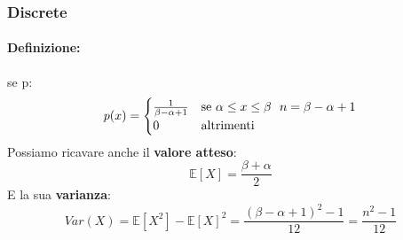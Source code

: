 \documentclass[]{article}
\newcommand{\ev}{\mathbb{E}[X]}
\renewcommand{\ev}[1]{\mathbb{E}[#1]}
\newcommand{\definizione}{\paragraph{Definizione:}}
\begin{document}
    \subsubsection{Discrete}
    \definizione se p:
    \begin{equation*}
        p(x) =
        \begin{cases}
            \frac{1}{\beta - \alpha + 1} & \text{se } \alpha \leq x \leq \beta \text{ \space} n = \beta - \alpha + 1 \\
            0 & \text{altrimenti}
        \end{cases}
    \end{equation*}
    Possiamo ricavare anche il \textbf{valore atteso}:
    \[ \ev{X} = \frac{\beta + \alpha}{2}\]
    E la sua \textbf{varianza}:
    \[ Var(X) = \ev{X^2} - \ev{X}^2 = \frac{(\beta - \alpha + 1)^2 - 1}{12} = \frac{n^2 - 1}{12}\]
\end{document}
